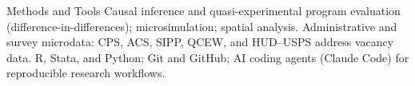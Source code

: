\begin{rubric}{Methods and Tools}
\entry*[Methods]%
    Causal inference and quasi-experimental program evaluation (difference-in-differences); microsimulation; spatial analysis.
\entry*[Data]%
    Administrative and survey microdata: CPS, ACS, SIPP, QCEW, and HUD--USPS address vacancy data.
\entry*[Software]%
    R, Stata, and Python; Git and GitHub; AI coding agents (Claude Code) for reproducible research workflows.
\end{rubric}
